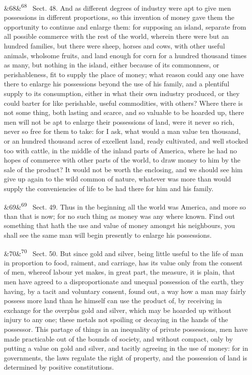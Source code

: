 \documentclass[12pt]{article}
\newcommand{\para}[1][]{\par\noindent\ifx&#1&\else\textsuperscript{\footnotesize #1}~\fi}
\begin{document}
\para[68] Sect. 48. And as different degrees of industry were apt to give men possessions in different proportions, so this invention of money gave them the opportunity to continue and enlarge them: for supposing an island, separate from all possible commerce with the rest of the world, wherein there were but an hundred families, but there were sheep, horses and cows, with other useful animals, wholsome fruits, and land enough for corn for a hundred thousand times as many, but nothing in the island, either because of its commonness, or perishableness, fit to supply the place of money; what reason could any one have there to enlarge his possessions beyond the use of his family, and a plentiful supply to its consumption, either in what their own industry produced, or they could barter for like perishable, useful commodities, with others? Where there is not some thing, both lasting and scarce, and so valuable to be hoarded up, there men will not be apt to enlarge their possessions of land, were it never so rich, never so free for them to take: for I ask, what would a man value ten thousand, or an hundred thousand acres of excellent land, ready cultivated, and well stocked too with cattle, in the middle of the inland parts of America, where he had no hopes of commerce with other parts of the world, to draw money to him by the sale of the product? It would not be worth the enclosing, and we should see him give up again to the wild common of nature, whatever was more than would supply the conveniencies of life to be had there for him and his family.

\para[69] Sect. 49. Thus in the beginning all the world was America, and more so than that is now; for no such thing as money was any where known. Find out something that hath the use and value of money amongst his neighbours, you shall see the same man will begin presently to enlarge his possessions.

\para[70] Sect. 50. But since gold and silver, being little useful to the life of man in proportion to food, raiment, and carriage, has its value only from the consent of men, whereof labour yet makes, in great part, the measure, it is plain, that men have agreed to a disproportionate and unequal possession of the earth, they having, by a tacit and voluntary consent, found out, a way how a man may fairly possess more land than he himself can use the product of, by receiving in exchange for the overplus gold and silver, which may be hoarded up without injury to any one; these metals not spoiling or decaying in the hands of the possessor. This partage of things in an inequality of private possessions, men have made practicable out of the bounds of society, and without compact, only by putting a value on gold and silver, and tacitly agreeing in the use of money: for in governments, the laws regulate the right of property, and the possession of land is determined by positive constitutions.
\end{document}

